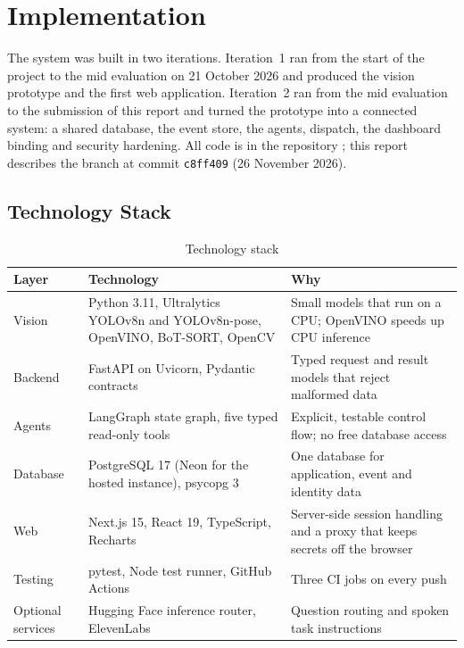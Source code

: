 \chapter{Implementation}
\label{ch:impl}

The system was built in two iterations. Iteration~1 ran from the start of the project to the mid evaluation on 21 October 2026 and produced the vision prototype and the first web application. Iteration~2 ran from the mid evaluation to the submission of this report and turned the prototype into a connected system: a shared database, the event store, the agents, dispatch, the dashboard binding and security hardening. All code is in the repository ; this report describes the  branch at commit \texttt{c8ff409} (26 November 2026).

\section{Technology Stack}
\begin{table}[H]
\centering
\caption{Technology stack}\label{tab:stack}
\begin{tabular}{P{0.2\textwidth}P{0.42\textwidth}P{0.3\textwidth}}
\toprule
Layer & Technology & Why\\
\midrule
Vision & Python 3.11, Ultralytics YOLOv8n and YOLOv8n-pose, OpenVINO, BoT-SORT, OpenCV & Small models that run on a CPU; OpenVINO speeds up CPU inference\\
Backend & FastAPI on Uvicorn, Pydantic contracts & Typed request and result models that reject malformed data\\
Agents & LangGraph state graph, five typed read-only tools & Explicit, testable control flow; no free database access\\
Database & PostgreSQL 17 (Neon for the hosted instance), psycopg 3 & One database for application, event and identity data\\
Web & Next.js 15, React 19, TypeScript, Recharts & Server-side session handling and a proxy that keeps secrets off the browser\\
Testing & pytest, Node test runner, GitHub Actions & Three CI jobs on every push\\
Optional services & Hugging Face inference router, ElevenLabs & Question routing and spoken task instructions\\
\bottomrule
\end{tabular}
\end{table}

